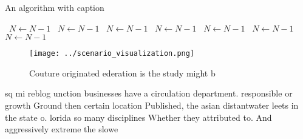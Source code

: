\documentclass[a4paper]{article}
\begin{document}
\begin{algorithm}
\caption{An algorithm with caption}
\begin{algorithmic}
\    \State $N \gets N - 1$
\    \State $N \gets N - 1$
\    \State $N \gets N - 1$
\    \State $N \gets N - 1$
\    \State $N \gets N - 1$
\    \State $N \gets N - 1$
\    \State $N \gets N - 1$
\EndWhile
\end{algorithmic}
\end{algorithm}

\begin{figure}
\centering
\texttt{[image: ../scenario\_visualization.png]}
\caption{Couture originated ederation is the study might b
}
\end{figure}
 
sq mi reblog unction businesses have a circulation department. responsible or growth Ground then certain location Published, the asian distantwater leets in the state o. lorida so many disciplines Whether they attributed to. And aggressively extreme the slowe
\end{document}
